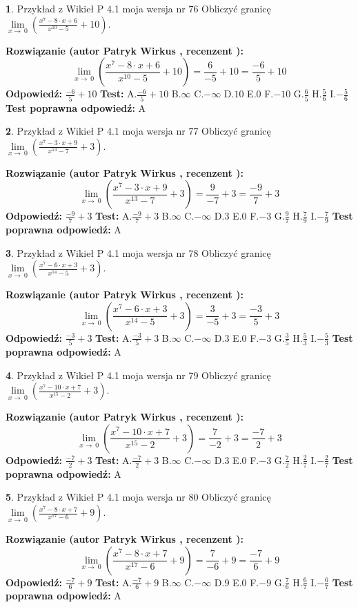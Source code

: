 \documentclass[12pt, a4paper]{article}
\theoremstyle{definition} %
\newtheorem{zad}{}
\newcommand{\zadStart}[1]{\begin{zad}#1\newline}
\newcommand{\zadStop}{\end{zad}}
\newcommand{\rozwStart}[2]{\noindent \textbf{Rozwiązanie (autor #1 , recenzent #2): }\newline}
\newcommand{\rozwStop}{\newline}
\newcommand{\odpStart}{\noindent \textbf{Odpowiedź:}\newline}
\newcommand{\odpStop}{\newline}
\newcommand{\testStart}{\noindent \textbf{Test:}\newline}
\newcommand{\testStop}{\newline}
\newcommand{\kluczStart}{\noindent \textbf{Test poprawna odpowiedź:}\newline}
\newcommand{\kluczStop}{\newline}
\begin{document}
\zadStart{Przykład z Wikieł P 4.1 moja wersja nr 76}
Obliczyć granicę $\lim\limits_{x\to\ 0}(\frac{x^{7}-8 \cdot x +6}{x^{10}-5}+10)$.
\zadStop
\rozwStart{Patryk Wirkus}{}
$$\lim\limits_{x\to\ 0}(\frac{x^{7}-8 \cdot x +6}{x^{10}-5}+10)=\frac{6}{-5}+10=\frac{-6}{5}+10$$
\rozwStop
\odpStart
$\frac{-6}{5}+10$
\odpStop
\testStart
A.$\frac{-6}{5}+10$
B.$\infty$
C.$-\infty$
D.$10$
E.$0$
F.$-10$
G.$\frac{6}{5}$
H.$\frac{5}{6}$
I.$-\frac{5}{6}$
\testStop
\kluczStart
A
\kluczStop



\zadStart{Przykład z Wikieł P 4.1 moja wersja nr 77}
Obliczyć granicę $\lim\limits_{x\to\ 0}(\frac{x^{7}-3 \cdot x +9}{x^{13}-7}+3)$.
\zadStop
\rozwStart{Patryk Wirkus}{}
$$\lim\limits_{x\to\ 0}(\frac{x^{7}-3 \cdot x +9}{x^{13}-7}+3)=\frac{9}{-7}+3=\frac{-9}{7}+3$$
\rozwStop
\odpStart
$\frac{-9}{7}+3$
\odpStop
\testStart
A.$\frac{-9}{7}+3$
B.$\infty$
C.$-\infty$
D.$3$
E.$0$
F.$-3$
G.$\frac{9}{7}$
H.$\frac{7}{9}$
I.$-\frac{7}{9}$
\testStop
\kluczStart
A
\kluczStop



\zadStart{Przykład z Wikieł P 4.1 moja wersja nr 78}
Obliczyć granicę $\lim\limits_{x\to\ 0}(\frac{x^{7}-6 \cdot x +3}{x^{14}-5}+3)$.
\zadStop
\rozwStart{Patryk Wirkus}{}
$$\lim\limits_{x\to\ 0}(\frac{x^{7}-6 \cdot x +3}{x^{14}-5}+3)=\frac{3}{-5}+3=\frac{-3}{5}+3$$
\rozwStop
\odpStart
$\frac{-3}{5}+3$
\odpStop
\testStart
A.$\frac{-3}{5}+3$
B.$\infty$
C.$-\infty$
D.$3$
E.$0$
F.$-3$
G.$\frac{3}{5}$
H.$\frac{5}{3}$
I.$-\frac{5}{3}$
\testStop
\kluczStart
A
\kluczStop



\zadStart{Przykład z Wikieł P 4.1 moja wersja nr 79}
Obliczyć granicę $\lim\limits_{x\to\ 0}(\frac{x^{7}-10 \cdot x +7}{x^{15}-2}+3)$.
\zadStop
\rozwStart{Patryk Wirkus}{}
$$\lim\limits_{x\to\ 0}(\frac{x^{7}-10 \cdot x +7}{x^{15}-2}+3)=\frac{7}{-2}+3=\frac{-7}{2}+3$$
\rozwStop
\odpStart
$\frac{-7}{2}+3$
\odpStop
\testStart
A.$\frac{-7}{2}+3$
B.$\infty$
C.$-\infty$
D.$3$
E.$0$
F.$-3$
G.$\frac{7}{2}$
H.$\frac{2}{7}$
I.$-\frac{2}{7}$
\testStop
\kluczStart
A
\kluczStop



\zadStart{Przykład z Wikieł P 4.1 moja wersja nr 80}
Obliczyć granicę $\lim\limits_{x\to\ 0}(\frac{x^{7}-8 \cdot x +7}{x^{17}-6}+9)$.
\zadStop
\rozwStart{Patryk Wirkus}{}
$$\lim\limits_{x\to\ 0}(\frac{x^{7}-8 \cdot x +7}{x^{17}-6}+9)=\frac{7}{-6}+9=\frac{-7}{6}+9$$
\rozwStop
\odpStart
$\frac{-7}{6}+9$
\odpStop
\testStart
A.$\frac{-7}{6}+9$
B.$\infty$
C.$-\infty$
D.$9$
E.$0$
F.$-9$
G.$\frac{7}{6}$
H.$\frac{6}{7}$
I.$-\frac{6}{7}$
\testStop
\kluczStart
A
\kluczStop
\end{document}
